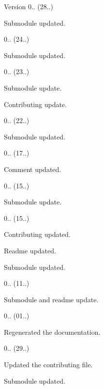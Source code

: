 \begin{DoxyVersion}{Version}
0.. (28..)
\begin{DoxyItemize}
\item Submodule updated. 
\end{DoxyItemize}

0.. (24..)
\begin{DoxyItemize}
\item Submodule updated. 
\end{DoxyItemize}

0.. (23..)
\begin{DoxyItemize}
\item Submodule update.
\item Contributing update. 
\end{DoxyItemize}

0.. (22..)
\begin{DoxyItemize}
\item Submodule updated. 
\end{DoxyItemize}

0.. (17..)
\begin{DoxyItemize}
\item Comment updated. 
\end{DoxyItemize}

0.. (15..)
\begin{DoxyItemize}
\item Submodule update. 
\end{DoxyItemize}

0.. (15..)
\begin{DoxyItemize}
\item Contributing updated.
\item Readme updated.
\item Submodule updated. 
\end{DoxyItemize}

0.. (11..)
\begin{DoxyItemize}
\item Submodule and readme update. 
\end{DoxyItemize}

0.. (01..)
\begin{DoxyItemize}
\item Regenerated the documentation. 
\end{DoxyItemize}

0.. (29..)
\begin{DoxyItemize}
\item Updated the contributing file.
\item Submodule updated. 
\end{DoxyItemize}


\end{DoxyVersion}
